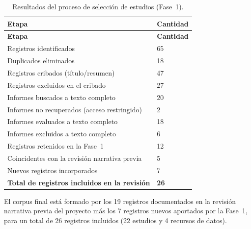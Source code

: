\begin{longtable}{L{9.5cm}L{3.5cm}}
\caption{Resultados del proceso de selección de estudios (Fase~1).}
\label{tab:seleccion} \\
\toprule
\textbf{Etapa} & \textbf{Cantidad} \\
\midrule
\endfirsthead
\toprule
\textbf{Etapa} & \textbf{Cantidad} \\
\midrule
\endhead
Registros identificados & 65 \\
Duplicados eliminados & 18 \\
Registros cribados (título/resumen) & 47 \\
Registros excluidos en el cribado & 27 \\
Informes buscados a texto completo & 20 \\
Informes no recuperados (acceso restringido) & 2 \\
Informes evaluados a texto completo & 18 \\
Informes excluidos a texto completo & 6 \\
Registros retenidos en la Fase~1 & 12 \\
\quad Coincidentes con la revisión narrativa previa & 5 \\
\quad Nuevos registros incorporados & 7 \\
\midrule
\textbf{Total de registros incluidos en la revisión} & \textbf{26} \\
\bottomrule
\end{longtable}

El corpus final está formado por los 19 registros documentados en la revisión
narrativa previa del proyecto más los 7 registros nuevos aportados por la
Fase~1, para un total de 26 registros incluidos (22 estudios y 4 recursos de
datos).

